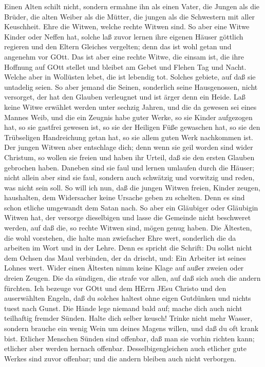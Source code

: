  Einen Alten schilt nicht, sondern ermahne ihn als einen
Vater, die Jungen als die Brüder,  die alten Weiber als die
Mütter, die jungen als die Schwestern mit aller Keuschheit. 
Ehre die Witwen, welche rechte Witwen sind.  So aber eine
Witwe Kinder oder Neffen hat, solche laß zuvor lernen ihre eigenen
Häuser göttlich regieren und den Eltern Gleiches vergelten; denn das ist
wohl getan und angenehm vor GOtt.  Das ist aber eine rechte
Witwe, die einsam ist, die ihre Hoffnung auf GOtt stellet und bleibet am
Gebet und Flehen Tag und Nacht.  Welche aber in Wollüsten
lebet, die ist lebendig tot.  Solches gebiete, auf daß sie
untadelig seien.  So aber jemand die Seinen, sonderlich
seine Hausgenossen, nicht versorget, der hat den Glauben verleugnet und
ist ärger denn ein Heide.  Laß keine Witwe erwählet werden
unter sechzig Jahren, und die da gewesen sei eines Mannes Weib,
 und die ein Zeugnis habe guter Werke, so sie Kinder
aufgezogen hat, so sie gastfrei gewesen ist, so sie der Heiligen Füße
gewaschen hat, so sie den Trübseligen Handreichung getan hat, so sie
allem guten Werk nachkommen ist.  Der jungen Witwen aber
entschlage dich; denn wenn sie geil worden sind wider Christum, so
wollen sie freien  und haben ihr Urteil, daß sie den ersten
Glauben gebrochen haben.  Daneben sind sie faul und lernen
umlaufen durch die Häuser; nicht allein aber sind sie faul, sondern auch
schwätzig und vorwitzig und reden, was nicht sein soll.  So
will ich nun, daß die jungen Witwen freien, Kinder zeugen, haushalten,
dem Widersacher keine Ursache geben zu schelten.  Denn es
sind schon etliche umgewandt dem Satan nach.  So aber ein
Gläubiger oder Gläubigin Witwen hat, der versorge dieselbigen und lasse
die Gemeinde nicht beschweret werden, auf daß die, so rechte Witwen
sind, mögen genug haben.  Die Ältesten, die wohl vorstehen,
die halte man zwiefacher Ehre wert, sonderlich die da arbeiten im Wort
und in der Lehre.  Denn es spricht die Schrift: Du sollst
nicht dem Ochsen das Maul verbinden, der da drischt, und: Ein Arbeiter
ist seines Lohnes wert.  Wider einen Ältesten nimm keine
Klage auf außer zweien oder dreien Zeugen.  Die da
sündigen, die strafe vor allen, auf daß sich auch die andern fürchten.
 Ich bezeuge vor GOtt und dem HErrn JEsu Christo und den
auserwählten Engeln, daß du solches haltest ohne eigen Gutdünken und
nichts tuest nach Gunst.  Die Hände lege niemand bald auf;
mache dich auch nicht teilhaftig fremder Sünden. Halte dich selber
keusch!  Trinke nicht mehr Wasser, sondern brauche ein
wenig Wein um deines Magens willen, und daß du oft krank bist.
 Etlicher Menschen Sünden sind offenbar, daß man sie vorhin
richten kann; etlicher aber werden hernach offenbar. 
Desselbigengleichen auch etlicher gute Werkes sind zuvor offenbar; und
die andern bleiben auch nicht verborgen.

